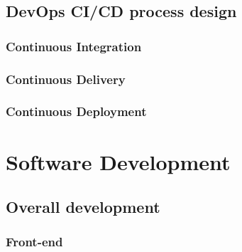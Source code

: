 \documentclass{article}
\begin{document}



    \subsection{DevOps CI/CD process design}
    
        \subsubsection{Continuous Integration}
        
        \subsubsection{Continuous Delivery}
        
        \subsubsection{Continuous Deployment}
        
\pagebreak

\section{Software Development} 

    \subsection{Overall development}
    
        \subsubsection{Front-end}
        
\end{document}

